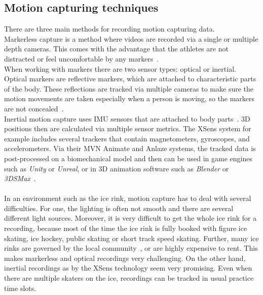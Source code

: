 \subsection{Motion capturing techniques}
\label{motioncapture}
There are three main methods for recording motion capturing data.\\
Markerless capture is a method where videos are recorded via a single or multiple depth cameras.
This comes with the advantage that the athletes are not distracted or feel uncomfortable by any
markers~\cite{mocapopticalradical, mocapopticalcapture, mocapmarkerless3dscans}.\\
When working with markers there are two sensor types: optical or inertial.
Optical markers are reflective markers, which are attached to characteristic parts of the body.
These reflections are tracked via multiple cameras to make sure the motion movements are taken especially when a
person is moving, so the markers are not concealed~\cite{mocapoptical}.\\
Inertial motion capture uses IMU sensors that are attached to body parts~\cite{xsens, mocapinterialneuron}.
3D positions then are calculated via multiple sensor metrics.
The XSens system for example includes several trackers that contain magnetometers, gyroscopes, and accelerometers.
Via their MVN Animate and Anlaze systems, the tracked data is post-processed on a biomechanical model
and then can be used in game engines such as \textit{Unity} or \textit{Unreal}, or in 3D animation software such as \textit{Blender} or
\textit{3DSMax}~\cite{xsensabout}.
\\\mbox{}\\
In an environment such as the ice rink, motion capture has to deal with several difficulties.
For one, the lighting is often not smooth and there are several different light sources.
Moreover, it is very difficult to get the whole ice rink for a recording, because most of the time the ice rink is fully
booked with figure ice skating, ice hockey, public skating or short track speed skating.
Further, many ice rinks are governed by the local community~\cite{stuttgarteiswelt}, or are highly expensive to rent.
This makes markerless and optical recordings very challenging.
On the other hand, inertial recordings as by the XSens technology seem very promising.
Even when there are multiple skaters on the ice, recordings can be tracked in usual practice time slots.


